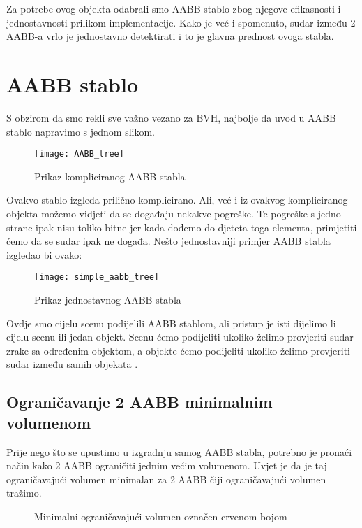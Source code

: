 Za potrebe ovog objekta odabrali smo AABB stablo zbog njegove efikasnosti i jednostavnosti prilikom implementacije. Kako je već i spomenuto, sudar između 2 AABB-a vrlo je jednostavno detektirati i to je glavna prednost ovoga stabla.

\section{AABB stablo}
S obzirom da smo rekli sve važno vezano za BVH, najbolje da uvod u AABB stablo napravimo s jednom slikom.
\begin{figure}[!http]
	\begin{center}
		\texttt{[image: AABB\_tree]}
		\caption{Prikaz kompliciranog AABB stabla \cite{5}}
		\label{fig:8}
	\end{center}
\end{figure}
Ovakvo stablo izgleda prilično komplicirano. Ali, već i iz ovakvog kompliciranog objekta možemo vidjeti da se događaju nekakve pogreške. Te pogreške s jedno strane ipak nisu toliko bitne jer kada dođemo do djeteta toga elementa, primjetiti ćemo da se sudar ipak ne događa. Nešto jednostavniji primjer AABB stabla izgledao bi ovako:
\begin{figure}[!http]
	\begin{center}
		\texttt{[image: simple\_aabb\_tree]}
		\caption{Prikaz jednostavnog AABB stabla}
		\label{fig:9}
	\end{center}
\end{figure}
\newline
Ovdje smo cijelu scenu podijelili AABB stablom, ali pristup je isti dijelimo li cijelu scenu ili jedan objekt. Scenu ćemo podijeliti ukoliko želimo provjeriti sudar zrake sa određenim objektom, a objekte ćemo podijeliti ukoliko želimo provjeriti sudar između samih objekata \cite{1}. 
\subsection{Ograničavanje 2 AABB minimalnim volumenom}\label{subsec:combineAABB}
Prije nego što se upustimo u izgradnju samog AABB stabla, potrebno je pronaći način kako 2 AABB ograničiti jednim većim volumenom. Uvjet je da je taj ograničavajući volumen minimalan za 2 AABB čiji ograničavajući volumen tražimo.

\begin{figure}[!http]
	\begin{center}
		\label{fig:10}
		\caption{Minimalni ograničavajući volumen označen crvenom bojom}
	\end{center}
\end{figure}

